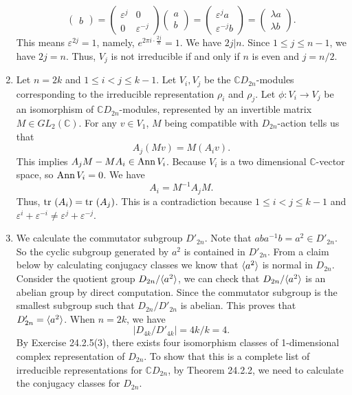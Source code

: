 \documentclass[a4paper, 12pt]{article}
\begin{document}
\begin{solution}
\begin{enumerate}[(1)]
\[\begin{pmatrix}
	b
\end{pmatrix}=\begin{pmatrix}
\varepsilon^j&0\\ 
0&\varepsilon^{-j}
\end{pmatrix}\begin{pmatrix}
a\\ 
b
\end{pmatrix}=\begin{pmatrix}
\varepsilon^ja\\ 
\varepsilon^{-j}b
\end{pmatrix}=\begin{pmatrix}
	\lambda a\\
	\lambda b
\end{pmatrix}.\]
This means \(\varepsilon^{2j}=1\), namely, \(e^{2\pi i\cdot \frac{2j}{n}}=1\). We have \(2j|n\). Since \(1\leq j\leq n-1\), we have \(2j=n\). Thus, \(V_j\) is not irreducible if and only if \(n\) is even and \(j=n/2\). 
\item Let \(n=2k\) and \(1\leq i<j\leq k-1\). Let \(V_i,V_j\) be the \(\mathbb{C}D_{2n}\)-modules corresponding to the irreducible representation \(\rho_i\) and \(\rho_j\). Let \(\phi:V_i\rightarrow V_j\) be an isomorphism of \(\mathbb{C}D_{2n}\)-modules, represented by 
an invertible matrix \(M\in GL_2(\mathbb{C})\). For any \(v\in V_1\), \(M\) being compatible with \(D_{2n}\)-action tells us that 
\[A_j(Mv)=M(A_iv).\]
This implies \(A_jM-MA_i\in \text{Ann}\, V_i\). Because \(V_i\) is a two dimensional \(\mathbb{C}\)-vector space, so \(\text{Ann}\, V_i=0\). We have 
\[A_i=M^{-1}A_jM.\]
Thus, \(\text{tr}\ (A_i)=\text{tr}\ (A_j)\). This is a contradiction because \(1\leq i<j\leq k-1\) and \(\varepsilon^{i}+\varepsilon^{-i}\neq \varepsilon^{j}+\varepsilon^{-j}\). 
\item We calculate the commutator subgroup \(D'_{2n}\). Note that \(aba^{-1}b=a^2\in D'_{2n}\). So the cyclic subgroup generated by \(a^2\) is contained in \(D'_{2n}\). From a claim below by calculating conjugacy classes we know that \(\langle a^2\rangle\) is normal in \(D_{2n}\). Consider the quotient group \(D_{2n}/\langle a^2\rangle\), we can check that \(D_{2n}/\langle a^2\rangle\) is an abelian group by direct computation. Since the commutator subgroup 
is the smallest subgroup such that \(D_{2n}/D'_{2n}\) is abelian. This proves that \(D'_{2n}=\langle a^2\rangle\). When \(n=2k\), we have 
\[|D_{4k}/D'_{4k}|=4k/k=4.\]
By Exercise 24.2.5(3), there exists four isomorphism classes of 1-dimensional complex representation of \(D_{2n}\). To show that this is a complete list of irreducible representations for \(\mathbb{C}D_{2n}\), by Theorem 24.2.2, we need to calculate the conjugacy classes for \(D_{2n}\). 

\end{enumerate}
\end{solution}
\end{document}
